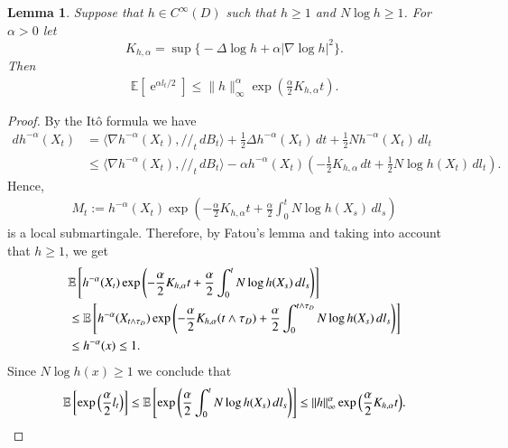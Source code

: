 \documentclass[11pt,reqno]{amsart}
\newtheorem{lemma}[theorem]{Lemma}
\theoremstyle{definition} \newtheorem{remark}[theorem]{Remark}
\numberwithin{equation}{section}
\newcommand\1{\mathbbm{1}}
\def\r{\right}
\def\l{\left} \def\e{\operatorname{e}} \def\dsum{\displaystyle\sum}
\newcommand{\ptr}{/\!/}
\begin{document}
\begin{lemma}\label{esti:local-time}
Suppose that $h\in C^{\infty}(D)$ such that $h\geq 1$ and $N\log h \geq 1$. For $\alpha>0$ let
$$K_{h,\alpha}=\sup\big\{-\Delta\log h+\alpha |\nabla \log h|^2\big\}.$$
 Then 
\begin{align*}
\mathbb{E}[\e^{\alpha l_t/2}]\leq \|h\|_{\infty}^{\alpha}\exp\l(\frac{\alpha}{2}K_{h,\alpha} t\r).
\end{align*}
\end{lemma}

\begin{proof}
By the It\^{o} formula we have
\begin{align*}
d h^{-\alpha}(X_t)&=\langle \nabla h^{-\alpha}(X_t), \ptr_t \, d B_t \rangle
+\frac12\Delta h^{-\alpha}(X_t)\,d t +\frac12Nh^{-\alpha}(X_t)\,d l_t\\
&\leq \langle \nabla h^{-\alpha}(X_t), \ptr_t \, d B_t \rangle-\alpha h^{-\alpha}(X_t)
\l(-\frac12K_{h,\alpha} \,dt+\frac12N\log h(X_t)\,dl_t\r).
\end{align*} 
Hence,
\begin{align*}
M_t:=h^{-\alpha}(X_t) \exp{\l(-\frac{\alpha}{2} K_{h,\alpha} t+\frac{\alpha}{2} \int_0^t N\log h(X_s)\,dl_s\r)}
\end{align*}
is a local submartingale.  Therefore, by Fatou's lemma and taking into account that $h\geq 1$, we get
\begin{align*}
  &\E\l[h^{-\alpha}(X_t)\exp\l(-\frac{\alpha}{2} K_{h,\alpha}t+\frac{\alpha}{2}
   \int_0^t N \log h(X_s)\, dl_s\r)\r]\\
  & \leq \E\l[h^{-\alpha}(X_{t\wedge \tau_D})
   \exp \l(-\frac{\alpha}{2} K_{h,\alpha}(t\wedge \tau_D)+\frac{\alpha}{2}
   \int_0^{t\wedge \tau_D} N\log h(X_s)\,dl_s\r)\r]\\
&\leq h^{-\alpha}(x)\leq 1.
\end{align*}
Since $N\log h(x)\geq 1$ we conclude that
\begin{equation*}
\E \l[\exp \Big(\frac{\alpha}{2} l_t\Big)\r]\leq \E\l[\exp \l(\frac{\alpha}{2} \int_0^t N\log h(X_s)\,dl_s\r)\r]\leq \|h\|_{\infty}^{\alpha}\exp\Big(\frac{\alpha}{2}K_{h,\alpha} t\Big).\qedhere 
\end{equation*}
\end{proof}
\end{document}
